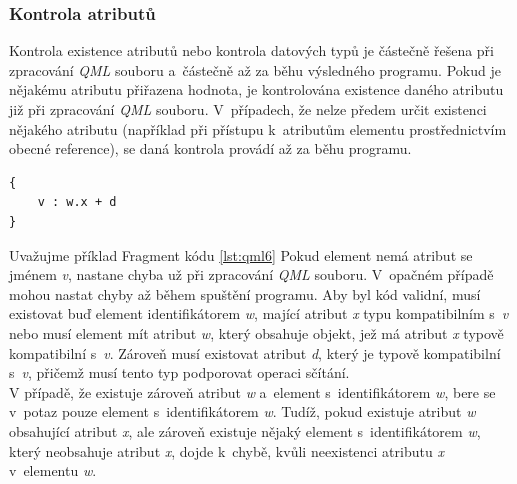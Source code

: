 \documentclass[11pt,twoside,a4paper]{book}
\begin{document}
\subsubsection{Kontrola atributů}
Kontrola existence atributů nebo kontrola datových typů je částečně řešena při zpracování \textit{QML} souboru a~částečně až za běhu výsledného programu. Pokud je nějakému atributu přiřazena hodnota, je kontrolována existence daného atributu již při zpracování \textit{QML} souboru. V~případech, že nelze předem určit existenci nějakého atributu (například při přístupu k~atributům elementu prostřednictvím obecné reference), se daná kontrola provádí až za běhu programu.
\begin{lstlisting}[frame=single,caption=Ukázka použití komponenty z jiného souboru.,label=lst:qml6]
{
	v : w.x + d
}
\end{lstlisting}
Uvažujme příklad Fragment kódu \ref{lst:qml6} Pokud element nemá atribut se jménem \textit{v}, nastane chyba už při zpracování \textit{QML} souboru. V~opačném případě mohou nastat chyby až během spuštění programu. Aby byl kód validní, musí existovat buď element identifikátorem \textit{w}, mající atribut \textit{x} typu kompatibilním s~\textit{v} nebo musí element mít atribut \textit{w}, který obsahuje objekt, jež má atribut \textit{x} typově kompatibilní s~\textit{v}. Zároveň musí existovat atribut \textit{d}, který je typově kompatibilní s~\textit{v}, přičemž musí tento typ podporovat operaci sčítání.\\
V případě, že existuje zároveň atribut \textit{w} a~element s~identifikátorem \textit{w}, bere se v~potaz pouze element s~identifikátorem \textit{w}. Tudíž, pokud existuje atribut \textit{w} obsahující atribut \textit{x}, ale zároveň existuje nějaký element s~identifikátorem \textit{w}, který neobsahuje atribut \textit{x}, dojde k~chybě, kvůli neexistenci atributu \textit{x} v~elementu \textit{w}. 
\end{document}
